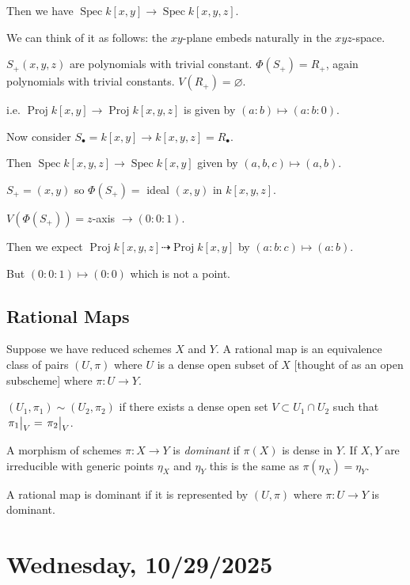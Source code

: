 \documentclass{article}
\theoremstyle{definition}
\begin{document}
    Then we have \(\operatorname{Spec} k[x,y] \to \operatorname{Spec} k[x,y,z]\).
    
    We can think of it as follows: the \(xy\)-plane embeds naturally in the \(xyz\)-space.

    \(S_+(x,y,z)\) are polynomials with trivial constant. \(\Phi(S_+) = R_+\), again polynomials with trivial constants. \(V(R_+) = \varnothing\).

    i.e. \(\operatorname{Proj} k[x,y] \to \operatorname{Proj} k[x,y,z]\) is given by \((a:b) \mapsto (a:b:0)\).

    Now consider \(S_\bullet = k[x,y] \to k[x,y,z] = R_\bullet\).

    Then \(\operatorname{Spec} k[x,y,z] \to \operatorname{Spec} k[x,y]\) given by \((a,b,c) \mapsto (a,b)\).
    
    \(S_+ = (x,y)\) so \(\Phi(S_+) =\) ideal \((x,y)\) in \(k[x,y,z]\).

    \(V(\Phi(S_+)) = z\)-axis \(\to (0:0:1)\).

    Then we expect \(\operatorname{Proj} k[x,y,z] \dashrightarrow \operatorname{Proj} k[x,y]\) by \((a:b:c) \mapsto (a:b)\).
    
    But \((0:0:1) \mapsto (0:0)\) which is not a point.

    \subsection*{Rational Maps}

    Suppose we have reduced schemes \(X\) and \(Y\). A rational map is an equivalence class of pairs \((U,\pi)\) where \(U\) is a dense open subset of \(X\) [thought of as an open subscheme] where \(\pi: U \to Y\).
    
    \((U_1 , \pi_1) \sim (U_2 , \pi_2)\) if there exists a dense open set \(V \subset U_1 \cap U_2\) such that \( \eval{\pi_1}_V = \eval{\pi_2}_V\).
    
    A morphism of schemes \(\pi: X \to Y\) is \textit{dominant} if \(\pi(X)\) is dense in \(Y\). If \(X , Y\) are irreducible with generic points \(\eta_X\) and \(\eta_Y\) this is the same as \(\pi(\eta_X) = \eta_Y\).

    A rational map is dominant if it is represented by \((U, \pi)\) where \(\pi: U \to Y\) is dominant.

    \section*{Wednesday, 10/29/2025}
    
\end{document}
